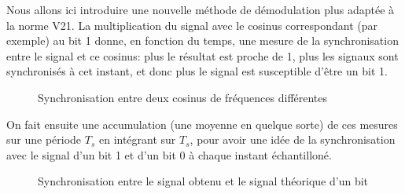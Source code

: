 \documentclass{article}
\begin{document}
Nous allons ici introduire une nouvelle méthode de démodulation plus adaptée à la norme V21.
La multiplication du signal avec le cosinus correspondant (par exemple) au bit 1 donne, en fonction du temps, une mesure de la synchronisation entre le signal et ce cosinus: plus le résultat est proche de 1, plus les signaux sont synchronisés à cet instant, et donc plus le signal est susceptible d'être un bit 1.

\begin{center}
\begin{figure}[H]
	\centering
	\caption{Synchronisation entre deux cosinus de fréquences différentes}
	\label{fig:synchronisation}
\end{figure}
\end{center}

On fait ensuite une accumulation (une moyenne en quelque sorte) de ces mesures sur une période $T_s$ en intégrant sur $T_s$, pour avoir une idée de la synchronisation avec le signal d'un bit 1 et d'un bit 0 à chaque instant échantilloné.


\begin{center}
\begin{figure}[H]
	\centering
	\caption{Synchronisation entre le signal obtenu et le signal théorique d'un bit}
\end{figure}
\end{center}
\end{document}
